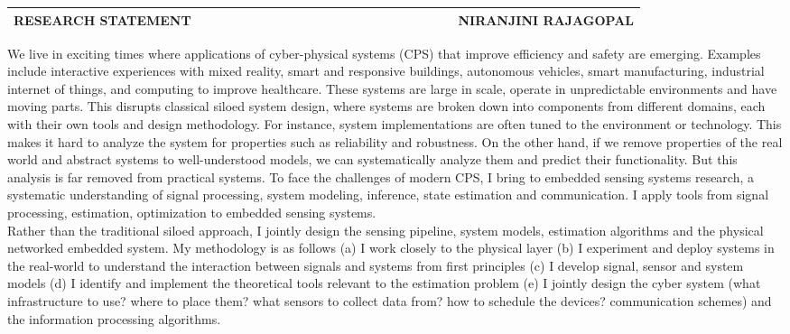 \documentclass[10pt]{article}
\date{}
\begin{document}

\begin{table}
\color{magenta}
\begin{tabular*}{\textwidth}{l r}
\large\textbf{RESEARCH STATEMENT} & 
\hfill \ \ \ \ \ \ \ \ \ \ \ \ \ \ \ \ \ \ \ \
\ \ \ \ \ \ \ \ \ \ \ \ \ \ \ 
\large\textbf{NIRANJINI RAJAGOPAL}\\
\hline
\end{tabular*}

\end{table}


We live in exciting times where applications of cyber-physical systems
(CPS) that improve efficiency and safety are emerging. Examples
include interactive experiences with mixed reality, smart and
responsive buildings, autonomous vehicles, smart manufacturing, industrial
internet of things, and computing to improve healthcare. These systems are large in scale, operate in unpredictable environments and have moving parts.  This disrupts classical siloed system design, where systems are broken down into components from different domains, each with their own tools and design methodology. For instance, system implementations are often tuned to the environment or technology. 
This makes it hard to analyze the system for properties such as reliability and
robustness. On the other hand, if we remove properties of the real
world and abstract systems to well-understood models, we can
systematically analyze them and predict their functionality. But this
analysis is far removed from practical systems. To face the challenges of modern CPS, 
I bring to embedded sensing systems research, a systematic understanding of signal processing, system modeling, inference, state estimation and communication. %
I apply tools from signal processing, estimation, optimization to embedded sensing systems.\\


Rather than the traditional siloed approach, I jointly design the sensing pipeline, system models, estimation algorithms and the physical networked embedded system. My methodology is as follows (a) I work closely to the physical layer (b) I experiment and deploy systems in the real-world to understand the interaction between signals and systems from first principles (c) I develop signal, sensor and system models (d) I identify and implement the theoretical tools relevant to the estimation problem (e) I jointly design the cyber system (what
infrastructure to use? where to place them? what sensors to collect
data from? how to schedule the devices? communication schemes) and the
information processing algorithms.
\end{document}
